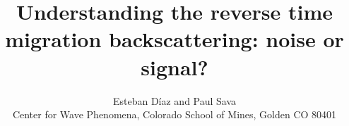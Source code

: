 



\author{Esteban D\'{i}az and Paul Sava\\ 
Center for Wave Phenomena,  
Colorado School of Mines, Golden CO 80401}

\title{Understanding the reverse time migration backscattering: noise or signal?}

\maketitle









